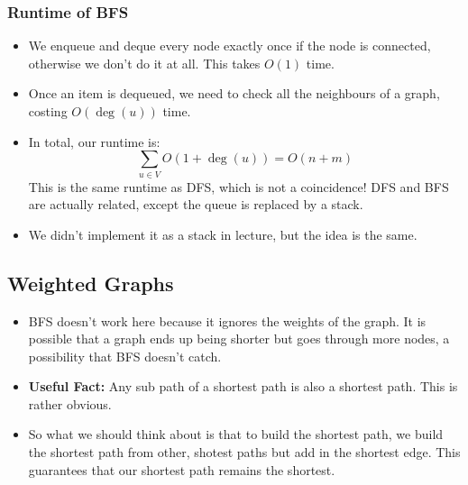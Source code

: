 	\subsubsection{Runtime of BFS}
	\begin{itemize}
		\item 	We enqueue and deque every node exactly once if the node is connected, otherwise we don't do it 
			at all. This takes $O(1)$ time. 
		\item Once an item is dequeued, we need to check all the neighbours of a graph, costing $O(\deg(u))$ 
			time.
		\item In total, our runtime is:
			\[
				\sum_{u \in V} O(1 + \deg(u)) = O(n + m)
			\] 
			This is the same runtime as DFS, which is not a coincidence! DFS and BFS are actually related, 
			except the queue is replaced by a stack.
		\item We didn't implement it as a stack in lecture, but the idea is the same.
	\end{itemize}

	\subsection{Weighted Graphs}
	\begin{itemize}
		\item BFS doesn't work here because it ignores the weights of the graph. It is possible that a graph 
			ends up being shorter but goes through more nodes, a possibility that BFS doesn't catch.
		\item \textbf{Useful Fact:} Any sub path of a shortest path is also a shortest path. This is rather 
			obvious.
		\item So what we should think about is that to build the shortest path, we build the shortest path from 
			other, shotest paths but add in the shortest edge. This guarantees that our shortest path 
			remains the shortest.
	\end{itemize}

